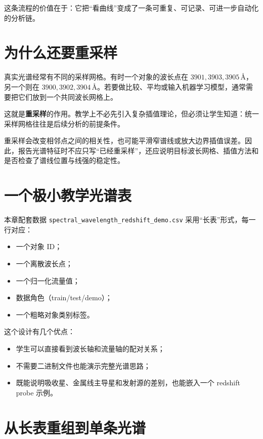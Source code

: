 这条流程的价值在于：它把“看曲线”变成了一条可重复、可记录、可进一步自动化的分析链。

\section{为什么还要重采样}

真实光谱经常有不同的采样网格。有时一个对象的波长点在 $3901, 3903, 3905\,\text{\AA}$，另一个则在 $3900, 3902, 3904\,\text{\AA}$。若要做比较、平均或输入机器学习模型，通常需要把它们放到一个共同波长网格上。

这就是\textbf{重采样}的作用。教学上不必先引入复杂插值理论，但必须让学生知道：统一采样网格往往是后续分析的前提条件。

\begin{warnbox}[重采样不是无损操作]
重采样会改变相邻点之间的相关性，也可能平滑窄谱线或放大边界插值误差。因此，报告光谱特征时不应只写“已经重采样”，还应说明目标波长网格、插值方法和是否检查了谱线位置与线强的稳定性。
\end{warnbox}

\section{一个极小教学光谱表}

本章配套数据 \nolinkurl{spectral_wavelength_redshift_demo.csv} 采用“长表”形式，每一行对应：

\begin{itemize}
    \item 一个对象 ID；
    \item 一个离散波长点；
    \item 一个归一化流量值；
    \item 数据角色（train/test/demo）；
    \item 一个粗略对象类别标签。
\end{itemize}

这个设计有几个优点：

\begin{itemize}
    \item 学生可以直接看到波长轴和流量轴的配对关系；
    \item 不需要二进制文件也能演示完整光谱思路；
    \item 既能说明吸收星、金属线主导星和发射源的差别，也能嵌入一个 redshift probe 示例。
\end{itemize}

\section{从长表重组到单条光谱}


